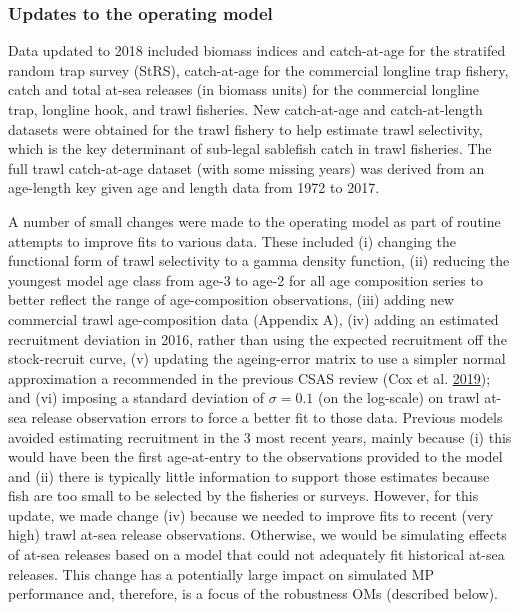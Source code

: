 \documentclass[11pt]{book}
\begin{document}
\hypertarget{updates-to-the-operating-model}{%
\subsubsection{Updates to the operating model}\label{updates-to-the-operating-model}}

Data updated to 2018 included biomass indices and catch-at-age for the stratifed random trap survey (StRS), catch-at-age for the commercial longline trap fishery, catch and total at-sea releases (in biomass units) for the commercial longline trap, longline hook, and trawl fisheries. New catch-at-age and catch-at-length datasets were obtained for the trawl fishery to help estimate trawl selectivity, which is the key determinant of sub-legal sablefish catch in trawl fisheries. The full trawl catch-at-age dataset (with some missing years) was derived from an age-length key given age and length data from 1972 to 2017.

A number of small changes were made to the operating model as part of routine attempts to improve fits to various data. These included (i) changing the functional form of trawl selectivity to a gamma density function, (ii) reducing the youngest model age class from age-3 to age-2 for all age composition series to better reflect the range of age-composition observations, (iii) adding new commercial trawl age-composition data (Appendix A), (iv) adding an estimated recruitment deviation in 2016, rather than using the expected recruitment off the stock-recruit curve, (v) updating the ageing-error matrix to use a simpler normal approximation a recommended in the previous CSAS review (Cox et al. \protect\hyperlink{ref-cox2019evaluating}{2019}); and (vi) imposing a standard deviation of \(\sigma = 0.1\) (on the log-scale) on trawl at-sea release observation errors to force a better fit to those data. Previous models avoided estimating recruitment in the 3 most recent years, mainly because (i) this would have been the first age-at-entry to the observations provided to the model and (ii) there is typically little information to support those estimates because fish are too small to be selected by the fisheries or surveys. However, for this update, we made change (iv) because we needed to improve fits to recent (very high) trawl at-sea release observations. Otherwise, we would be simulating effects of at-sea releases based on a model that could not adequately fit historical at-sea releases. This change has a potentially large impact on simulated MP performance and, therefore, is a focus of the robustness OMs (described below).
\end{document}
